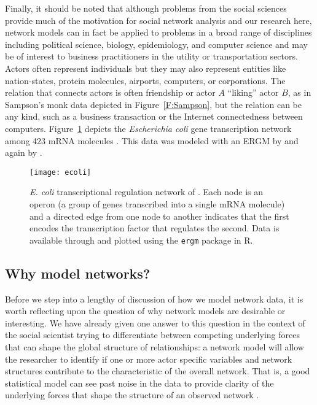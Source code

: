 Finally, it should be noted that although problems from the social sciences provide much of the 
motivation for social network analysis and our research here, network models can in 
fact be applied to problems in a broad range of disciplines including political 
science, biology, epidemiology, and computer science and may be of interest
to business practitioners in the utility or transportation sectors.  
Actors often represent individuals but 
they may also represent entities like nation-states, protein molecules, airports, 
computers, or corporations.  The relation that connects actors 
is often friendship or actor $A$ 
``liking'' actor $B$, as in Sampson's monk data depicted in Figure~\ref{F:Sampson}, 
but the relation can be any kind, such as a business transaction or the 
Internet connectedness between computers.  Figure~\ref{F:ecoli} depicts the
\textit{Escherichia coli} gene transcription network among 423 mRNA molecules 
\citep*{Shen-Orr,Salgado}. This data was 
modeled with an ERGM by \citet*{Saul:2007} and again by \citet*{Hummel}.

\begin{figure}[h!]
\begin{center}
\texttt{[image: ecoli]} %
\end{center}
\caption[\textit{E. coli} transcriptional regulation network of \citet{Shen-Orr}]{\textit{E. coli} transcriptional regulation network of \citet{Shen-Orr}.  Each node is an operon (a group of genes transcribed into a single mRNA molecule) and a directed edge from one node to another indicates 
that the first encodes the transcription factor that regulates the second.
Data is available through and plotted using the \texttt{ergm} package \citep{ergm:R} in R.}
\label{F:ecoli}
\end{figure}



\subsection{Why model networks?}
Before we step into a lengthy of discussion of how we model network data, it is 
worth reflecting upon the question of why network models are desirable or interesting.  We 
have already given one answer to this question in the context of the social scientist 
trying to differentiate between competing underlying forces that can shape the global 
structure of relationships: a network model will allow the researcher to 
identify if one or more actor specific variables and network structures 
contribute to the characteristic of the overall network.  That is, a good statistical 
model can see past noise in the data to
provide clarity of the underlying forces that shape the structure of an observed network
\citep*{Goodreau:2009}.   


